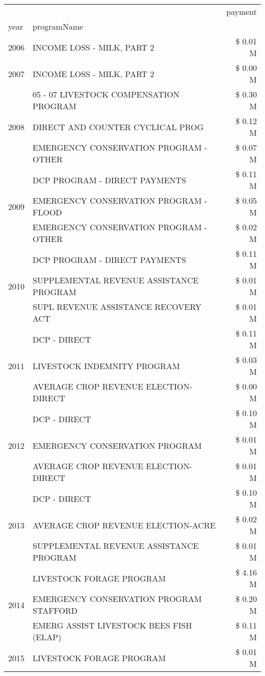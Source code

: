 \begin{tabular}{llr}
\toprule
 &  & payment \\
year & programName &  \\
\midrule
2006 & INCOME LOSS - MILK, PART 2 & \$ 0.01 M \\
\cline{1-3}
2007 & INCOME LOSS - MILK, PART 2 & \$ 0.00 M \\
\cline{1-3}
\multirow[t]{3}{*}{2008} & 05 - 07 LIVESTOCK COMPENSATION PROGRAM & \$ 0.30 M \\
 & DIRECT AND COUNTER CYCLICAL PROG & \$ 0.12 M \\
 & EMERGENCY CONSERVATION PROGRAM - OTHER & \$ 0.07 M \\
\cline{1-3}
\multirow[t]{3}{*}{2009} & DCP PROGRAM - DIRECT PAYMENTS & \$ 0.11 M \\
 & EMERGENCY CONSERVATION PROGRAM - FLOOD & \$ 0.05 M \\
 & EMERGENCY CONSERVATION PROGRAM - OTHER & \$ 0.02 M \\
\cline{1-3}
\multirow[t]{3}{*}{2010} & DCP PROGRAM - DIRECT PAYMENTS & \$ 0.11 M \\
 & SUPPLEMENTAL REVENUE ASSISTANCE PROGRAM & \$ 0.01 M \\
 & SUPL REVENUE ASSISTANCE RECOVERY ACT & \$ 0.01 M \\
\cline{1-3}
\multirow[t]{3}{*}{2011} & DCP - DIRECT & \$ 0.11 M \\
 & LIVESTOCK INDEMNITY PROGRAM & \$ 0.03 M \\
 & AVERAGE CROP REVENUE ELECTION-DIRECT & \$ 0.00 M \\
\cline{1-3}
\multirow[t]{3}{*}{2012} & DCP - DIRECT & \$ 0.10 M \\
 & EMERGENCY CONSERVATION PROGRAM & \$ 0.01 M \\
 & AVERAGE CROP REVENUE ELECTION-DIRECT & \$ 0.01 M \\
\cline{1-3}
\multirow[t]{3}{*}{2013} & DCP - DIRECT & \$ 0.10 M \\
 & AVERAGE CROP REVENUE ELECTION-ACRE & \$ 0.02 M \\
 & SUPPLEMENTAL REVENUE ASSISTANCE PROGRAM & \$ 0.01 M \\
\cline{1-3}
\multirow[t]{3}{*}{2014} & LIVESTOCK FORAGE PROGRAM & \$ 4.16 M \\
 & EMERGENCY CONSERVATION PROGRAM STAFFORD & \$ 0.20 M \\
 & EMERG ASSIST LIVESTOCK BEES FISH (ELAP) & \$ 0.11 M \\
\cline{1-3}
\multirow[t]{3}{*}{2015} & LIVESTOCK FORAGE PROGRAM & \$ 0.01 M \\

\end{tabular}
